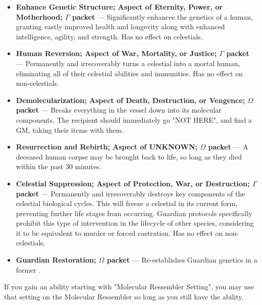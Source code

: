 \documentclass[green]{guardians}
\begin{document}
\begin{itemize}

\item \textbf{Enhance Genetic Structure; Aspect of Eternity, Power, or Motherhood; $\Gamma$ packet} --- Significantly enhances the genetics of a human, granting vastly improved health and longevity along with enhanced intelligence, agility, and strength. Has no effect on celestials.

\item \textbf{Human Reversion; Aspect of War, Mortality, or Justice; $\Gamma$ packet} --- Permanently and irrecoverably turns a celestial into a mortal human, eliminating all of their celestial abilities and immunities. Has no effect on non-celestials.

\item \textbf{Demolecularization; Aspect of Death, Destruction, or Vengence; $\Omega$ packet} --- Breaks everything in the vessel down into its molecular components. The recipient should immediately go "NOT HERE", and find a GM, taking their items with them.

\item \textbf{Resurrection and Rebirth; Aspect of UNKNOWN; $\Omega$ packet} --- A deceased human corpse may be brought back to life, so long as they died within the past 30 minutes.

\item \textbf{Celestial Suppression; Aspect of Protection, War, or Destruction; $\Gamma$ packet} --- Permanently and irrecoverably destroys key components of the celestial biological cycles. This will freeze a celestial in its current form, preventing further life stages from occurring. Guardian protocols specifically prohibit this type of intervention in the lifecycle of other species, considering it to be equivalent to murder or forced castration. Has no effect on non-celestials.

\item \textbf{Guardian Restoration; $\Omega$ packet} --- Re-establishes Guardian genetics in a former .
	
\end{itemize}

If you gain an ability starting with "Molecular Ressembler Setting", you may use that setting on the Molecular Ressembler so long as you still have the \aGuardianTech{} ability.
\end{document}
